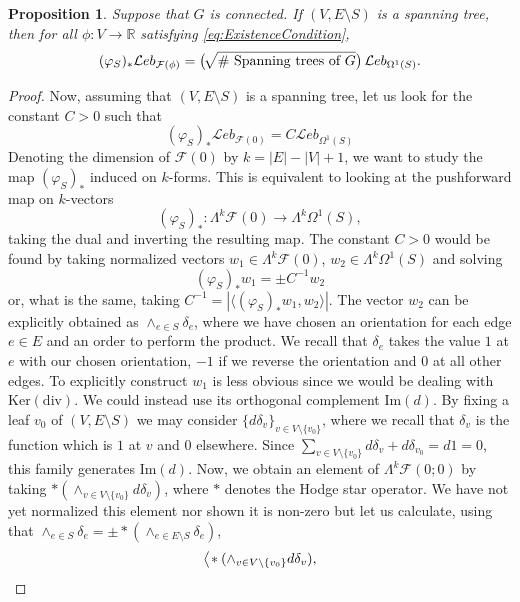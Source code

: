 \documentclass[11pt,a4paper]{amsart}
\numberwithin{equation}{section}
\newtheorem{proposition}[theorem]{Proposition}
\theoremstyle{definition}
\begin{document}
\begin{proposition}
    \label{prop:divergence_volume}
Suppose that $G$ is connected. If $(V,E\setminus S)$ is a spanning tree, then for all $\phi:V\to\mathbb{R}$ satisfying \eqref{eq:ExistenceCondition},
\[(\varphi_S)_* \mathcal Leb_{\mathcal F(\phi)}	= \big(\hspace{-0.5mm} \sqrt{\# \mbox{ Spanning trees of } G}	\big)\,
	\mathcal Leb_{\Omega^1(S)}.\]
\end{proposition}
\begin{proof}
Now, assuming that $(V,E\setminus S)$
	is a spanning tree, let us look 
	for the constant $C>0$ such that
	\[(\varphi_S)_* \mathcal Leb_{\mathcal F(0)}	= C	\mathcal Leb_{\Omega^1(S)}\]
	Denoting the dimension of
	$\mathcal F(0)$ by $k = |E|-|V| +1$,
	we want to study the map $(\varphi_S)_*$ induced
	on $k$-forms. This is equivalent to looking at
	the pushforward map on $k$-vectors
	\[(\varphi_S)_*: \Lambda^k
	\mathcal F(0) \to 
	\Lambda^k \Omega^1(S),\]
	taking the dual and inverting the resulting map.
	The constant $C>0$ would be found
	by taking normalized
	vectors $w_1 \in \Lambda^k
	\mathcal F(0) $, $w_2 \in \Lambda^k \Omega^1(S)$ and 
	solving
	\[(\varphi_S)_* w_1 = \pm C^{-1} w_2\]
	or, what is the same,
	taking $C^{-1} = |\langle (\varphi_S)_* w_1 , w_2\rangle| $.
	The vector $w_2$ can be explicitly obtained
	as $\wedge_{e \in S} \delta_{e}$, where
	we have
	chosen an orientation for each edge $e \in E$ 
	and an order to perform the product.
	We recall that
	 $\delta_{e}$
	takes the value $1$ at $e$ with our chosen orientation,
	$-1$ if we reverse the orientation and
	$0$ at all other edges. To 
	explicitly construct $w_1$ is less obvious since
	we would be dealing with
	$\mathrm{Ker}(\mathrm{div})$. We
	could instead use its orthogonal complement
	$\mathrm{Im}(d)$.
	By fixing a leaf $v_0$
	of $(V,E\setminus S)$ we may consider
	$\{d \delta_{v} \}_{v \in V \setminus \{v_0\}}$,
	where we recall that
	$\delta_{v}$ is the function which is $1$ at $v$
	and $0$ elsewhere.
	Since $\sum_{v \in V \setminus \{v_0\}}
	d\delta_{v} + d\delta_{v_0} = d 1= 0$, this family
	generates $\mathrm{Im}(d)$. Now,
	we obtain an element of
	$\Lambda^k \mathcal F(0;0)$ by taking 
	$*(\wedge_{v \in V\setminus \{v_0\}} d \delta_{v})$,
	where $*$ denotes the Hodge star operator.
	We have not yet normalized this element nor shown it is non-zero but let us calculate,
	using that 
	$ \wedge_{e \in S} \delta_{e} = \pm 
	* (\wedge_{e \in E\setminus S} \delta_{e})  $,
	\[
	\big<  \hspace{-0.5mm} *(\wedge_{v \in V\setminus \{v_0\}} d \delta_{v}),
\]
\end{proof}
\end{document}
